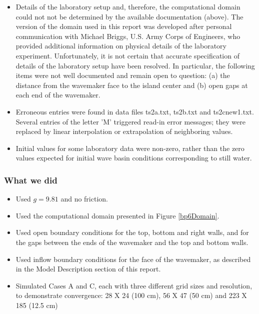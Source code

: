 \begin {itemize}
\item Details of the laboratory setup and, therefore, the computational domain could not not be determined by the available documentation (above).  The version of the domain used in this report was developed after personal communication with Michael Briggs, U.S. Army Corps of Engineers, who  provided additional information on physical details of the laboratory experiment.  Unfortunately, it is not certain that accurate specification of details of the laboratory setup have been resolved.  In particular, the following items were not well documented and remain open to question: (a) the distance from the wavemaker face to the island center and (b) open gaps at each end of the wavemaker.
\item Erroneous entries were found in data files ts2a.txt, ts2b.txt and ts2cnew1.txt.  Several entries of the letter 'M' triggered read-in error messages; they were replaced by linear interpolation or extrapolation of neighboring values.
\item Initial values for some laboratory data were non-zero, rather than the zero values expected for initial wave basin conditions corresponding to still water. 
\end{itemize} 

\subsubsection{What we did}

\begin{itemize}
\item Used $g=9.81$ and no friction.
\item Used the computational domain presented in Figure \ref{bp6Domain}.

\item Used open boundary conditions for the top, bottom and right walls, and for the gaps between the ends of the wavemaker and the top and bottom walls.
\item Used inflow boundary conditions for the face of the wavemaker, as described in the Model Description section of this report.
\item Simulated Cases A and C, each with three different grid sizes and resolution, to demonstrate convergence:  28 X 24 (100 cm), 56 X 47 (50 cm) and  223 X 185 (12.5 cm)
\end{itemize}

